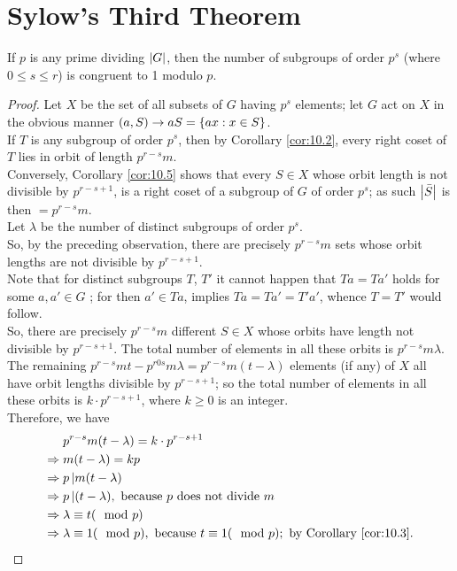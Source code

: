 \documentclass[../main-sheet.tex]{subfiles}
\begin{document}
\section{Sylow's Third Theorem}
\begin{thm}
    If \(p\) is any prime dividing \(\left\vert G\right\vert\), then the number of subgroups of order \(p^s\)
(where \(0 \leq s \leq r \)) is congruent to 1 modulo \(p\).
\end{thm}
\begin{proof}
    Let \(X\) be the set of all subsets of \(G\) having \(p^s\) elements; let \(G\) act on \(X\) in the
    obvious manner \((a,S) \to aS = \left\{ax: x \in S\right\}\).\\
    If \(T\) is any subgroup of order \(p^s\), then by Corollary \ref{cor:10.2}, every right coset of \(T\) lies in
    orbit of length \(p^{r-s}m\).\\
    Conversely, Corollary \ref{cor:10.5} shows that every \(S\in X\) whose orbit length is not divisible
    by \(p^{r-s+1}\), is a right coset of a subgroup of \(G\) of order \(p^s \); as such \(\left\vert\bar{S}\right\vert\) is then \( = p^{r-s}m\).\\
    Let \(\lambda\) be the number of distinct subgroups of order \(p^s\).\\

    So, by the preceding observation, there are precisely \(p^{r-s}m\) sets whose orbit lengths
    are not divisible by \(p^{r-s+1}\).\\

    Note that for distinct subgroups \(T \), \(T'\) it cannot happen that \(Ta = Ta'\) holds for some
    \(a,a' \in G\) ; for then \(a' \in Ta\), implies \(Ta = Ta' = T' a' \), whence \(T = T'\) would follow.\\
    So, there are precisely \(p^{r-s}m\) different \(S\in X\) whose orbits have length not divisible
    by \(p^{r-s+1}\). The total number of elements in all these orbits is \(p^{r-s}m\lambda\).\\

    The remaining \(p^{r-s}mt-p^{r0s}m\lambda=p^{r-s}m(t-\lambda)\) elements (if any) of \(X\) all have orbit lengths divisible by \(p^{r-s+1}\); so the total number of elements in all these orbits is \(k\cdot p^{r-s+1}\), where \(k\geq 0\) is an integer.\\


    Therefore, we have
    \begin{align*}
        &p^{r-s} m( t -\lambda) = k\cdot p^{r-s+1}\\
        \Rightarrow\;& m(t - \lambda) = kp\\
        \Rightarrow\;& p\,|  m(t - \lambda)\\
        \Rightarrow\;& p \,| (t - \lambda), \text{ because \(p\) does not divide } m\\ 
        \Rightarrow\;& \lambda \equiv t (\mod p)\\
        \Rightarrow\;& \lambda \equiv 1 (\mod p), \text{ because } t\equiv 1 (\mod p); \text{ by Corollary \ref{cor:10.3}}.
    \end{align*}
\end{proof}
    
\end{document}
